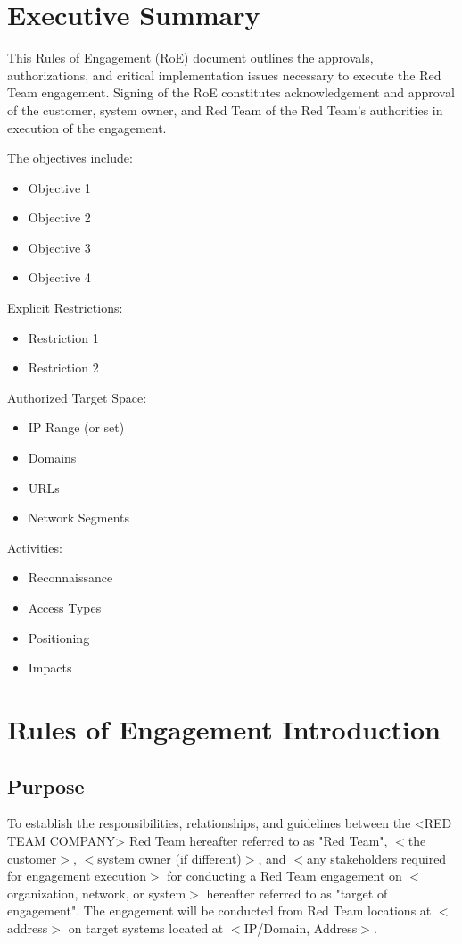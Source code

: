 \documentclass[12pt,letterpaper]{article}
\newenvironment{highlights}{%
  \begin{tcolorbox}[colback=light, colframe=primary, boxrule=0.5pt]
}{%
  \end{tcolorbox}
}
\begin{document}
\section{Executive Summary}
\begin{highlights}
This Rules of Engagement (RoE) document outlines the approvals, authorizations, and critical implementation issues necessary to execute the Red Team engagement. Signing of the RoE constitutes acknowledgement and approval of the customer, system owner, and Red Team of the Red Team's authorities in execution of the engagement.

The objectives include:
\begin{itemize}
    \item Objective 1
    \item Objective 2
    \item Objective 3
    \item Objective 4
\end{itemize}

Explicit Restrictions:
\begin{itemize}
    \item Restriction 1
    \item Restriction 2
\end{itemize}

Authorized Target Space:
\begin{itemize}
    \item IP Range (or set)
    \item Domains
    \item URLs
    \item Network Segments
\end{itemize}

Activities:
\begin{itemize}
    \item Reconnaissance
    \item Access Types
    \item Positioning
    \item Impacts
\end{itemize}
\end{highlights}

\section{Rules of Engagement Introduction}
\subsection{Purpose}
To establish the responsibilities, relationships, and guidelines between the <RED TEAM COMPANY> Red Team hereafter referred to as "Red Team", $<$the customer$>$, $<$system owner (if different)$>$, and $<$any stakeholders required for engagement execution$>$ for conducting a Red Team engagement on $<$organization, network, or system$>$ hereafter referred to as "target of engagement". The engagement will be conducted from Red Team locations at $<$address$>$ on target systems located at $<$IP/Domain, Address$>$.
\end{document}
